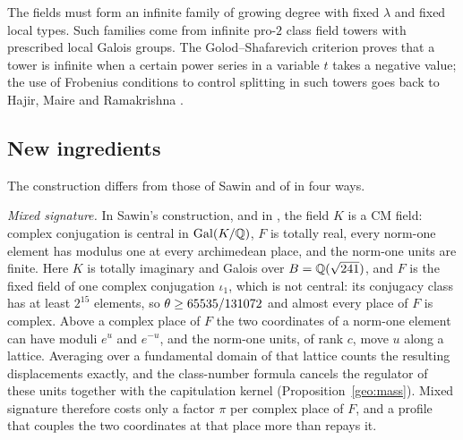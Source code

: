 The fields must form an infinite family of growing degree with fixed
$\lambda$ and fixed local types. Such families come from infinite
pro-$2$ class field towers with prescribed local Galois groups. The
Golod--Shafarevich criterion \cite{GolodShafarevich} proves that a tower
is infinite when a certain power series in a variable $t$ takes a
negative value; the use of Frobenius conditions to control splitting in
such towers goes back to Hajir, Maire and Ramakrishna
\cite{HajirMaireRamakrishna2021Cutting}.

\subsection{New ingredients}\label{intro:new}
The construction differs from those of Sawin \cite{Sawin2026} and of
\cite{Naslund0358} in four ways.

\emph{Mixed signature.} In Sawin's construction, and in
\cite{Naslund0358}, the field $K$ is a CM field: complex conjugation is
central in $\operatorname{Gal}(K/\mathbb Q)$, $F$ is totally real, every norm-one element has
modulus one at every archimedean place, and the norm-one units are
finite. Here $K$ is totally imaginary and Galois over $B=\mathbb Q(\sqrt{241})$,
and $F$ is the fixed field of one complex conjugation $\iota_1$, which is
not central: its conjugacy class has at least $2^{15}$ elements, so
$\theta\ge65535/131072$ and almost every place of $F$ is complex. Above a
complex place of $F$ the two coordinates of a norm-one element can have
moduli $e^u$ and $e^{-u}$, and the norm-one units, of rank $c$, move $u$
along a lattice. Averaging over a fundamental domain of that lattice
counts the resulting displacements exactly, and the class-number formula
cancels the regulator of these units together with the capitulation
kernel (Proposition~\ref{geo:mass}). Mixed signature therefore costs only
a factor $\pi$ per complex place of $F$, and a profile that couples the
two coordinates at that place more than repays it.

